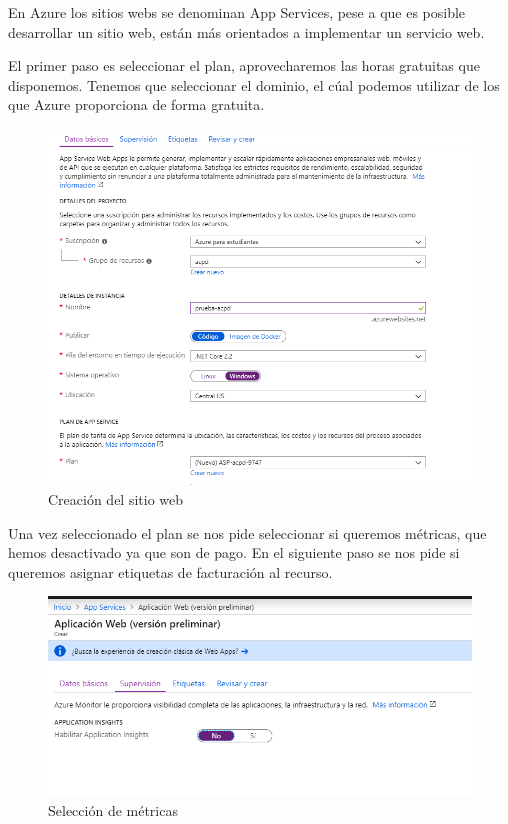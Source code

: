 En Azure los sitios webs se denominan App Services, pese a que es posible desarrollar un sitio web, están más orientados a implementar un servicio web.

\newpage
El primer paso es seleccionar el plan, aprovecharemos las horas gratuitas que disponemos. Tenemos que seleccionar el dominio, el cúal podemos utilizar de los que Azure proporciona de forma gratuita.

\begin{figure}[h]
	\centering
	\includegraphics[scale=0.55]{web_azure/creacion1.png}
	\caption{Creación del sitio web}
	\label{AZWEB1}
\end{figure}

Una vez seleccionado el plan se nos pide seleccionar si queremos métricas, que hemos desactivado ya que son de pago. En el siguiente paso se nos pide si queremos asignar etiquetas de facturación al recurso.

\begin{figure}[h]
	\centering
	\includegraphics[scale=0.55]{web_azure/creacion2.png}
	\caption{Selección de métricas}
	\label{AZWEB2}
\end{figure}


